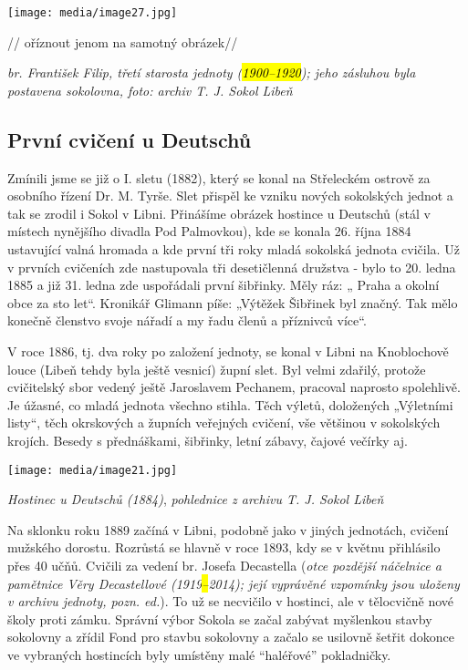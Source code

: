 \texttt{[image: media/image27.jpg]}

// oříznout jenom na samotný obrázek//

\emph{br. František Filip, třetí starosta jednoty (\hl{1900--⁠⁠⁠⁠⁠⁠1920});
jeho zásluhou byla postavena sokolovna, foto: archiv T. J. Sokol Libeň}

\subsection{První cvičení u
Deutschů}\label{prvnuxed-cviux10denuxed-u-deutschux16f}

Zmínili jsme se již o I. sletu (1882), který se konal na Střeleckém
ostrově za osobního řízení Dr. M. Tyrše. Slet přispěl ke vzniku nových
sokolských jednot a tak se zrodil i Sokol v Libni. Přinášíme obrázek
hostince u Deutschů (stál v místech nynějšího divadla Pod Palmovkou),
kde se konala 26. října 1884 ustavující valná hromada a kde první tři
roky mladá sokolská jednota cvičila. Už v prvních cvičeních zde
nastupovala tři desetičlenná družstva - bylo to 20. ledna 1885 a již 31.
ledna zde uspořádali první šibřinky. Měly ráz: „ Praha a okolní obce za
sto let``. Kronikář Glimann píše: „Výtěžek Šibřinek byl značný. Tak mělo
konečně členstvo svoje nářadí a my řadu členů a příznivců více``.

V roce 1886, tj. dva roky po založení jednoty, se konal v Libni na
Knoblochově louce (Libeň tehdy byla ještě vesnicí) župní slet. Byl velmi
zdařilý, protože cvičitelský sbor vedený ještě Jaroslavem Pechanem,
pracoval naprosto spolehlivě. Je úžasné, co mladá jednota všechno
stihla. Těch výletů, doložených „Výletními listy``, těch okrskových a
župních veřejných cvičení, vše většinou v sokolských krojích. Besedy s
přednáškami, šibřinky, letní zábavy, čajové večírky aj.

\texttt{[image: media/image21.jpg]}

\emph{Hostinec u Deutschů (1884)}, \emph{pohlednice z archivu T. J.
Sokol Libeň}

Na sklonku roku 1889 začíná v Libni, podobně jako v jiných jednotách,
cvičení mužského dorostu. Rozrůstá se hlavně v roce 1893, kdy se v
květnu přihlásilo přes 40 učňů. Cvičili za vedení br. Josefa Decastella
(\emph{otce pozdější náčelnice a pamětnice Věry Decastellové
(1919\hl{--}2014); její vyprávěné vzpomínky jsou uloženy v archivu
jednoty, pozn. ed.}). To už se necvičilo v hostinci, ale v tělocvičně
nové školy proti zámku. Správní výbor Sokola se začal zabývat myšlenkou
stavby sokolovny a zřídil Fond pro stavbu sokolovny a začalo se usilovně
šetřit dokonce ve vybraných hostincích byly umístěny malé ``haléřové''
pokladničky.

